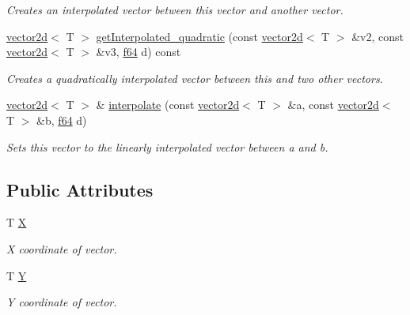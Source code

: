 \begin{DoxyCompactItemize}
\begin{DoxyCompactList}\small\item\em Creates an interpolated vector between this vector and another vector. \end{DoxyCompactList}\item 
\hyperlink{classirr_1_1core_1_1vector2d}{vector2d}$<$ T $>$ \hyperlink{classirr_1_1core_1_1vector2d_a4d1636973532da5ee0c3c42f96f19ef9}{get\+Interpolated\+\_\+quadratic} (const \hyperlink{classirr_1_1core_1_1vector2d}{vector2d}$<$ T $>$ \&v2, const \hyperlink{classirr_1_1core_1_1vector2d}{vector2d}$<$ T $>$ \&v3, \hyperlink{namespaceirr_a1325b02603ad449f92c68fc640af9b28}{f64} d) const 
\begin{DoxyCompactList}\small\item\em Creates a quadratically interpolated vector between this and two other vectors. \end{DoxyCompactList}\item 
\hyperlink{classirr_1_1core_1_1vector2d}{vector2d}$<$ T $>$ \& \hyperlink{classirr_1_1core_1_1vector2d_a85bc48f5c313764fd56b51c730a62210}{interpolate} (const \hyperlink{classirr_1_1core_1_1vector2d}{vector2d}$<$ T $>$ \&a, const \hyperlink{classirr_1_1core_1_1vector2d}{vector2d}$<$ T $>$ \&b, \hyperlink{namespaceirr_a1325b02603ad449f92c68fc640af9b28}{f64} d)
\begin{DoxyCompactList}\small\item\em Sets this vector to the linearly interpolated vector between a and b. \end{DoxyCompactList}\end{DoxyCompactItemize}
\subsection*{Public Attributes}
\begin{DoxyCompactItemize}
\item 
T \hyperlink{classirr_1_1core_1_1vector2d_a8fabb0d10a3dd33b407b63bb3539be4d}{X}\hypertarget{classirr_1_1core_1_1vector2d_a8fabb0d10a3dd33b407b63bb3539be4d}{}\label{classirr_1_1core_1_1vector2d_a8fabb0d10a3dd33b407b63bb3539be4d}

\begin{DoxyCompactList}\small\item\em X coordinate of vector. \end{DoxyCompactList}\item 
T \hyperlink{classirr_1_1core_1_1vector2d_aa4d36f518d3fc35a7aafcea33a31f76c}{Y}\hypertarget{classirr_1_1core_1_1vector2d_aa4d36f518d3fc35a7aafcea33a31f76c}{}\label{classirr_1_1core_1_1vector2d_aa4d36f518d3fc35a7aafcea33a31f76c}

\begin{DoxyCompactList}\small\item\em Y coordinate of vector. \end{DoxyCompactList}\end{DoxyCompactItemize}


